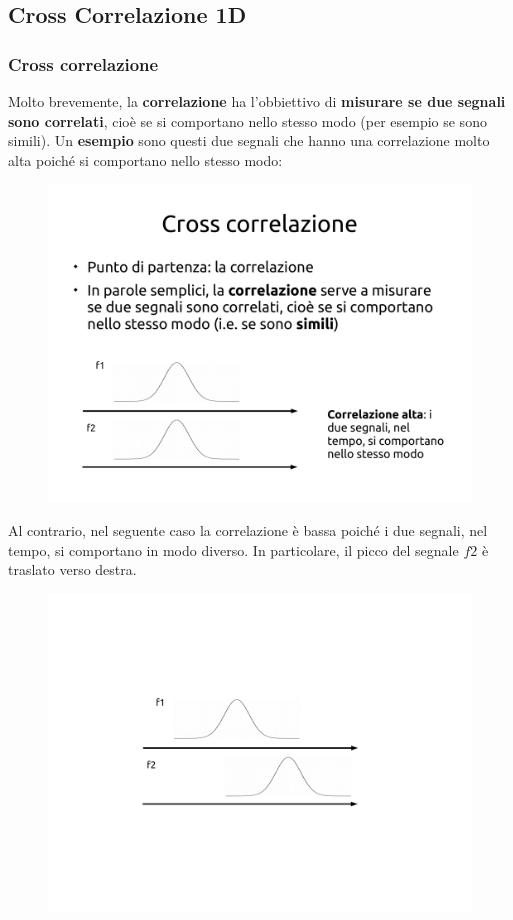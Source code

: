 \documentclass[a4paper]{article}
\begin{document}
	\subsection{Cross Correlazione 1D}
	
	\subsubsection{Cross correlazione}
	
	Molto brevemente, la \textbf{correlazione} ha l'obbiettivo di \textbf{misurare se due segnali sono correlati}, cioè se si comportano nello stesso modo (per esempio se sono simili). Un \textcolor{Green4}{\textbf{esempio}} sono questi due segnali che hanno una correlazione molto alta poiché si comportano nello stesso modo:
	\begin{figure}[!htp]
		\centering
		\includegraphics[width=.6\textwidth]{img/lab/cross-correlazione.pdf}
	\end{figure}
	
	\noindent
	Al contrario, nel seguente caso la correlazione è bassa poiché i due segnali, nel tempo, si comportano in modo diverso. In particolare, il picco del segnale $f2$ è traslato verso destra.
	\begin{figure}[!htp]
		\centering
		\includegraphics[width=.6\textwidth]{img/lab/cross-correlazione-2.pdf}
	\end{figure}
	
\end{document}
